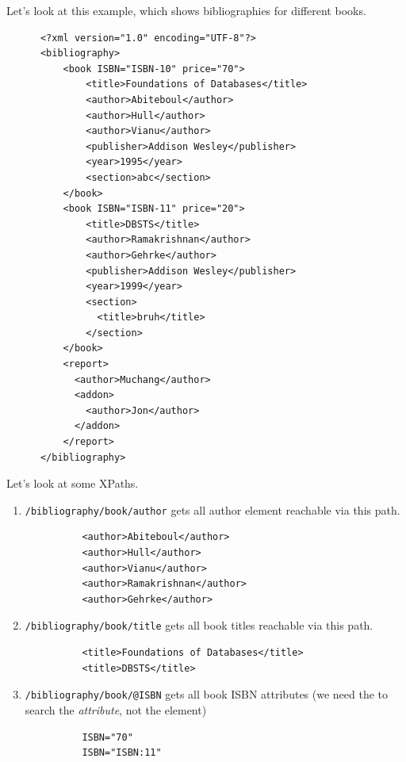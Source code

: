   \begin{example}
    \label{ex:bibliographies-in-different-formats}
    Let's look at this example, which shows bibliographies for different books. 
    \begin{lstlisting}
      <?xml version="1.0" encoding="UTF-8"?>
      <bibliography>
          <book ISBN="ISBN-10" price="70">
              <title>Foundations of Databases</title>
              <author>Abiteboul</author>
              <author>Hull</author>
              <author>Vianu</author>
              <publisher>Addison Wesley</publisher>
              <year>1995</year>
              <section>abc</section>
          </book>
          <book ISBN="ISBN-11" price="20">
              <title>DBSTS</title>
              <author>Ramakrishnan</author>
              <author>Gehrke</author>
              <publisher>Addison Wesley</publisher>
              <year>1999</year>
              <section>
                <title>bruh</title>
              </section>
          </book>
          <report>
            <author>Muchang</author>
            <addon>
              <author>Jon</author>
            </addon>
          </report>
      </bibliography> 
    \end{lstlisting}
    Let's look at some XPaths. 
    \begin{enumerate}
      \item \texttt{/bibliography/book/author} gets all author element reachable via this path.
        \begin{lstlisting}
          <author>Abiteboul</author>
          <author>Hull</author>
          <author>Vianu</author>
          <author>Ramakrishnan</author>
          <author>Gehrke</author>
        \end{lstlisting}

      \item \texttt{/bibliography/book/title} gets all book titles reachable via this path. 
        \begin{lstlisting}
          <title>Foundations of Databases</title>
          <title>DBSTS</title>
        \end{lstlisting}

      \item \texttt{/bibliography/book/@ISBN} gets all book ISBN attributes (we need the \texttt{\@} to search the \textit{attribute}, not the element)
        \begin{lstlisting}
          ISBN="70"
          ISBN="ISBN:11"
        \end{lstlisting}


\end{enumerate}
\end{example}
